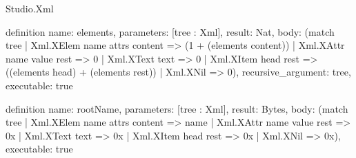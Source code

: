 \begin{lexlean}{Studio.Xml}
\begin{semanticmodule}
definition{
  name: elements,
  parameters: [tree : Xml],
  result: Nat,
  body: (match tree
    | Xml.XElem name attrs content => (1 + (elements content))
    | Xml.XAttr name value rest => 0
    | Xml.XText text => 0
    | Xml.XItem head rest => ((elements head) + (elements rest))
    | Xml.XNil => 0),
  recursive_argument: tree,
  executable: true
}

definition{
  name: rootName,
  parameters: [tree : Xml],
  result: Bytes,
  body: (match tree
    | Xml.XElem name attrs content => name
    | Xml.XAttr name value rest => 0x
    | Xml.XText text => 0x
    | Xml.XItem head rest => 0x
    | Xml.XNil => 0x),
  executable: true
}

\end{semanticmodule}
\end{lexlean}
